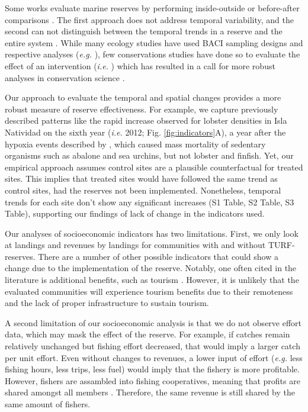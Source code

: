 \documentclass{frontiersSCNS}
\begin{document}
Some works evaluate marine reserves by performing inside-outside
\citep{guidetti_2014-8Z,friedlander_2017-oI,rodriguez_2017-PD} or
before-after comparisons \citep{betti_2017-lq}. The first approach does
not address temporal variability, and the second can not distinguish
between the temporal trends in a reserve and the entire system
\citep{depalma_2018}. While many ecology studies have used BACI sampling
designs and respective analyses (\emph{e.g.} \citep{stewartoaten_1986}),
few conservations studies have done so to evaluate the effect of an
intervention (\emph{i.e.}
\citet{francinifilho_2008,lester_2009,moland_2013}) which has resulted
in a call for more robust analyses in conservation science
\citep{guidetti_2002,ferraro_2006}.

Our approach to evaluate the temporal and spatial changes provides a
more robust measure of reserve effectiveness. For example, we capture
previously described patterns like the rapid increase observed for
lobster densities in Isla Natividad on the sixth year (\emph{i.e.} 2012;
Fig. \ref{fig:indicators}A), a year after the hypoxia events described
by \citet{micheli_2012-EU}, which caused mass mortality of sedentary
organisms such as abalone and sea urchins, but not lobster and finfish.
Yet, our empirical approach assumes control sites are a plausible
counterfactual for treated sites. This implies that treated sites would
have followed the same trend as control sites, had the reserves not been
implemented. Nonetheless, temporal trends for each site don't show any
significant increases (S1 Table, S2 Table, S3 Table), supporting our
findings of lack of change in the indicators used.

Our analyses of socioeconomic indicators has two limitations. First, we
only look at landings and revenues by landings for communities with and
without TURF-reserves. There are a number of other possible indicators
that could show a change due to the implementation of the reserve.
Notably, one often cited in the literature is additional benefits, such
as tourism \citep{viana_2017}. However, it is unlikely that the
evaluated communities will experience tourism benefits due to their
remoteness and the lack of proper infrastructure to sustain tourism.

A second limitation of our socioeconomic analysis is that we do not
observe effort data, which may mask the effect of the reserve. For
example, if catches remain relatively unchanged but fishing effort
decreased, that would imply a larger catch per unit effort. Even without
changes to revenues, a lower input of effort (\emph{e.g.} less fishing
hours, less trips, less fuel) would imply that the fishery is more
profitable. However, fishers are assambled into fishing cooperatives,
meaning that profits are shared amongst all members
\citep{mccay_2014,mccay_2017}. Therefore, the same revenue is still
shared by the same amount of fishers.
\end{document}
